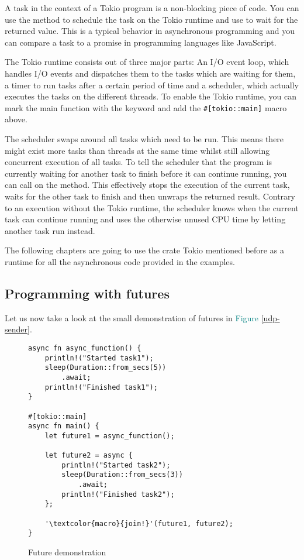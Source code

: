 A task in the context of a Tokio program is a non-blocking piece of code. You can use the 
method to schedule the task on the Tokio runtime and use  to wait for the returned value. This is a typical
behavior in asynchronous programming and you can compare a task to a promise in programming languages like JavaScript.

The Tokio runtime consists out of three major parts: An I/O event loop, which handles I/O events and dispatches them to
the tasks which are waiting for them, a timer to run tasks after a certain period of time and  a scheduler, which
actually executes the tasks on the different threads. To enable the Tokio runtime, you can mark the main function with
the  keyword and add the \texttt{#[tokio::main]} macro above.

The scheduler swaps around all tasks which need to be run. This means there might exist more tasks than threads at the
same time whilst still allowing concurrent execution of all tasks. To tell the scheduler that the program is currently
waiting for another task to finish before it can continue running, you can call  on the method. This
effectively stops the execution of the current task, waits for the other task to finish and then unwraps the returned
result. Contrary to an execution without the Tokio runtime, the scheduler knows when the current task can continue
running and uses the otherwise unused CPU time by letting another task run instead.

The following chapters are going to use the crate Tokio mentioned before as a runtime for all the asynchronous code
provided in the examples.

\subsection{Programming with futures}
Let us now take a look at the small demonstration of futures in \textcolor{teal}{Figure \ref{udp-sender}}.

\begin{figure}[ht]
    \begin{verbatim}
async fn async_function() {
    println!("Started task1");
    sleep(Duration::from_secs(5))
        .await;
    println!("Finished task1");
}

#[tokio::main]
async fn main() {
    let future1 = async_function();

    let future2 = async {
        println!("Started task2");
        sleep(Duration::from_secs(3))
            .await;
        println!("Finished task2");
    };

    '\textcolor{macro}{join!}'(future1, future2);
}
    \end{verbatim}
    \caption{Future demonstration}
    \label{future}
\end{figure}

